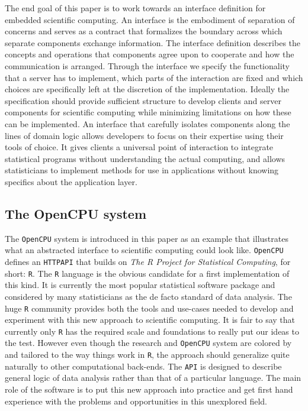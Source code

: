 \documentclass{article}
\newcommand{\R}{\texttt{R}\xspace}
\newcommand{\HTTP}{\texttt{HTTP}\xspace}
\newcommand{\API}{\texttt{API}\xspace}
\newcommand{\OpenCPU}{\texttt{OpenCPU}\xspace}
\begin{document}
The end goal of this paper is to work towards an interface definition for embedded scientific computing. An interface is the embodiment of separation of concerns and serves as a contract that formalizes the boundary across which separate components exchange information. The interface definition describes the concepts and operations that components agree upon to cooperate and how the communication is arranged. Through the interface we specify the functionality that a server has to implement, which parts of the interaction are fixed and which choices are specifically left at the discretion of the implementation. Ideally the specification should provide sufficient structure to develop clients and server components for scientific computing while minimizing limitations on how these can be implemented. An interface that carefully isolates components along the lines of domain logic allows developers to focus on their expertise using their tools of choice. It gives clients a universal point of interaction to integrate statistical programs without understanding the actual computing, and allows statisticians to implement methods for use in applications without knowing specifics about the application layer.


\subsection{The OpenCPU system}

The \OpenCPU system is introduced in this paper as an example that illustrates what an abstracted interface to scientific computing could look like. \OpenCPU defines an \HTTP \API that builds on \emph{The R Project for Statistical Computing}, for short: \R \citep{R}. The \R language is the obvious candidate for a first implementation of this kind. It is currently the most popular statistical software package and considered by many statisticians as the de facto standard of data analysis. The huge \R community provides both the tools and use-cases needed to develop and experiment with this new approach to scientific computing. It is fair to say that currently only \R has the required scale and foundations to really put our ideas to the test. However even though the research and \OpenCPU system are colored by and tailored to the way things work in \R, the approach should generalize quite naturally to other computational back-ends. The \texttt{API} is designed to describe general logic of data analysis rather than that of a particular language. The main role of the software is to put this new approach into practice and get first hand experience with the problems and opportunities in this unexplored field. 
\end{document}
